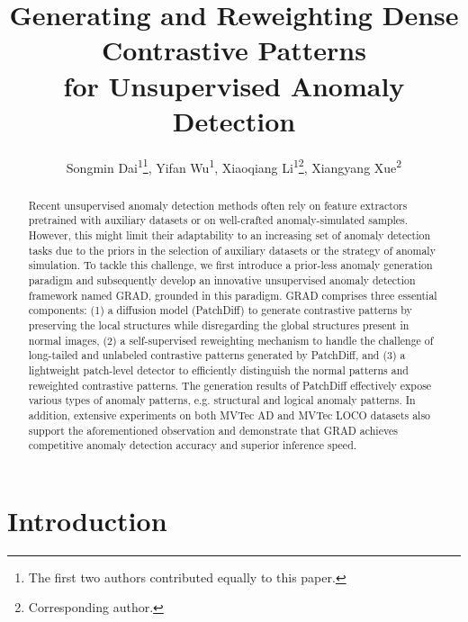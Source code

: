 \documentclass[letterpaper]{article} %
\begin{document}
\title{Generating and Reweighting Dense Contrastive Patterns\\for Unsupervised Anomaly Detection}
\author{
    Songmin Dai\textsuperscript{\rm 1}\thanks{The first two authors contributed equally to this paper.},
    Yifan Wu\textsuperscript{\rm 1}\footnotemark[1],
    Xiaoqiang Li\textsuperscript{\rm 1}\thanks{Corresponding author.},
    Xiangyang Xue\textsuperscript{\rm 2}
}

\maketitle


\begin{abstract}
Recent unsupervised anomaly detection methods often rely on feature extractors pretrained with auxiliary datasets or on well-crafted anomaly-simulated samples. However, this might limit their adaptability to an increasing set of anomaly detection tasks due to the priors in the selection of auxiliary datasets or the strategy of anomaly simulation. To tackle this challenge, we first introduce a prior-less anomaly generation paradigm and subsequently develop an innovative unsupervised anomaly detection framework named GRAD, grounded in this paradigm. GRAD comprises three essential components: (1) a diffusion model (PatchDiff) to generate contrastive patterns by preserving the local structures while disregarding the global structures present in normal images, (2) a self-supervised reweighting mechanism to handle the challenge of long-tailed and unlabeled contrastive patterns generated by PatchDiff, and (3) a lightweight patch-level detector to efficiently distinguish the normal patterns and reweighted contrastive patterns. The generation results of PatchDiff effectively expose various types of anomaly patterns, e.g. structural and logical anomaly patterns. In addition, extensive experiments on both MVTec AD and MVTec LOCO datasets also support the aforementioned observation and demonstrate that GRAD achieves competitive anomaly detection accuracy and superior inference speed.
\end{abstract}

\section{Introduction}
\label{sec:introduction}
\end{document}
